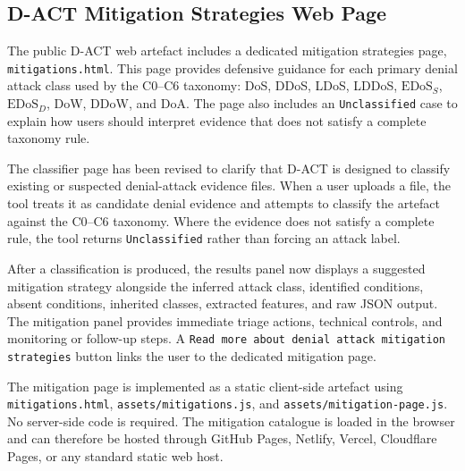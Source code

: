 \subsection{D-ACT Mitigation Strategies Web Page}
\label{app:dact_mitigation_page}

The public D-ACT web artefact includes a dedicated mitigation strategies page, \texttt{mitigations.html}. This page provides defensive guidance for each primary denial attack class used by the C0--C6 taxonomy: DoS, DDoS, LDoS, LDDoS, \(\text{EDoS}_{S}\), \(\text{EDoS}_{D}\), DoW, DDoW, and DoA. The page also includes an \texttt{Unclassified} case to explain how users should interpret evidence that does not satisfy a complete taxonomy rule.

The classifier page has been revised to clarify that D-ACT is designed to classify existing or suspected denial-attack evidence files. When a user uploads a file, the tool treats it as candidate denial evidence and attempts to classify the artefact against the C0--C6 taxonomy. Where the evidence does not satisfy a complete rule, the tool returns \texttt{Unclassified} rather than forcing an attack label.

After a classification is produced, the results panel now displays a suggested mitigation strategy alongside the inferred attack class, identified conditions, absent conditions, inherited classes, extracted features, and raw JSON output. The mitigation panel provides immediate triage actions, technical controls, and monitoring or follow-up steps. A \texttt{Read more about denial attack mitigation strategies} button links the user to the dedicated mitigation page.

The mitigation page is implemented as a static client-side artefact using \texttt{mitigations.html}, \texttt{assets/mitigations.js}, and \texttt{assets/mitigation-page.js}. No server-side code is required. The mitigation catalogue is loaded in the browser and can therefore be hosted through GitHub Pages, Netlify, Vercel, Cloudflare Pages, or any standard static web host.
